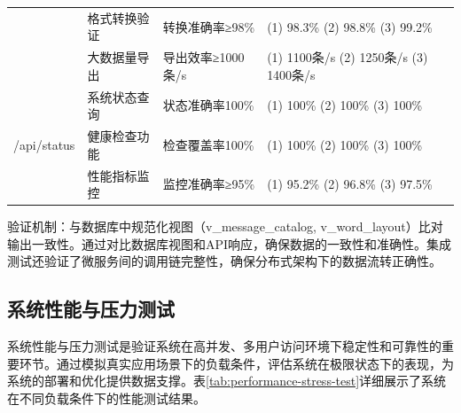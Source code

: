 \begin{table}[H]
{\begin{tabular}{|l|l|l|l|}
\cline{2-4}
& 格式转换验证 & 转换准确率≥98\% & (1) 98.3\% (2) 98.8\% (3) 99.2\% \\
\cline{2-4}
& 大数据量导出 & 导出效率≥1000条/s & (1) 1100条/s (2) 1250条/s (3) 1400条/s \\
\hline
\multirow{3}{*}{/api/status} & 系统状态查询 & 状态准确率100\% & (1) 100\% (2) 100\% (3) 100\% \\
\cline{2-4}
& 健康检查功能 & 检查覆盖率100\% & (1) 100\% (2) 100\% (3) 100\% \\
\cline{2-4}
& 性能指标监控 & 监控准确率≥95\% & (1) 95.2\% (2) 96.8\% (3) 97.5\% \\
\hline
\end{tabular}%
}
\end{table}

验证机制：与数据库中规范化视图（v\_message\_catalog, v\_word\_layout）比对输出一致性。通过对比数据库视图和API响应，确保数据的一致性和准确性。集成测试还验证了微服务间的调用链完整性，确保分布式架构下的数据流转正确性。

\subsection{系统性能与压力测试}

系统性能与压力测试是验证系统在高并发、多用户访问环境下稳定性和可靠性的重要环节。通过模拟真实应用场景下的负载条件，评估系统在极限状态下的表现，为系统的部署和优化提供数据支撑。表\ref{tab:performance-stress-test}详细展示了系统在不同负载条件下的性能测试结果。

